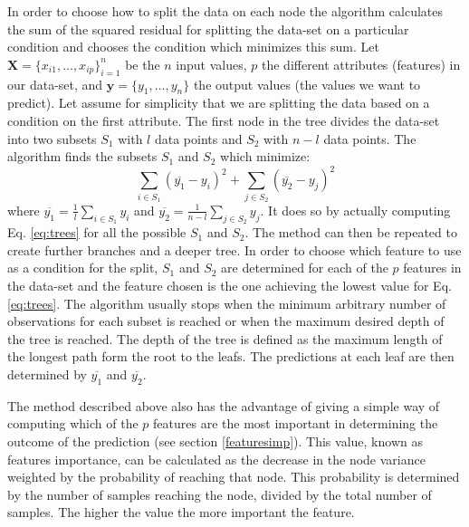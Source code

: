 In order to choose how to split the data on each node the algorithm calculates the sum of the squared residual for splitting the data-set on a particular condition and chooses the condition which minimizes this sum. Let $\bm{X} = \{x_{i1},\ldots ,x_{ip}\}_{i=1}^{n}$ be the $n$ input values, $p$ the different attributes (features) in our data-set, and $\mathbf{y} = \{y_{1},\ldots ,y_{n}\}$ the output values (the values we want to predict). Let assume for simplicity that we are splitting the data based on a condition on the first attribute. The first node in the tree divides the data-set into two subsets $S_1$ with $l$ data points and $S_2$ with $n-l$ data points. The algorithm finds the subsets $S_1$ and $S_2$ which minimize:
\begin{equation}\label{eq:trees}
\sum_{i \in S_1}(\overline{y_1}-y_i)^2 + \sum_{j \in S_2}(\overline{y_2}-y_j)^2
\end{equation}
where  $\overline{y_1} = \frac{1}{l}\sum_{i \in S_1}y_i$ and $\overline{y_2} = \frac{1}{n-l}\sum_{j \in S_2}y_j$. It does so by actually computing Eq. \ref{eq:trees} for all the possible $S_1$ and $S_2$. The method can then be repeated to create further branches and a deeper tree. In order to choose which feature to use as a condition for the split, $S_1$ and $S_2$ are determined for each of the $p$ features in the data-set and the feature chosen is the one achieving the lowest value for Eq. \ref{eq:trees}. The algorithm usually stops when the minimum arbitrary number of observations for each subset is reached or when the maximum desired depth of the tree is reached. The depth of the tree is defined as the maximum length of the longest path form the root to the leafs. The predictions at each leaf are then determined by $\overline{y_1}$ and $\overline{y_2}$.

The method described above also has the advantage of giving a simple way of computing which of the $p$ features are the most important in determining the outcome of the prediction (see section \ref{featuresimp}). This value, known as features importance, can be calculated as the decrease in the node variance weighted by the probability of reaching that node. This probability is determined by the number of samples reaching the node, divided by the total number of samples. The higher the value the more important the feature. 

